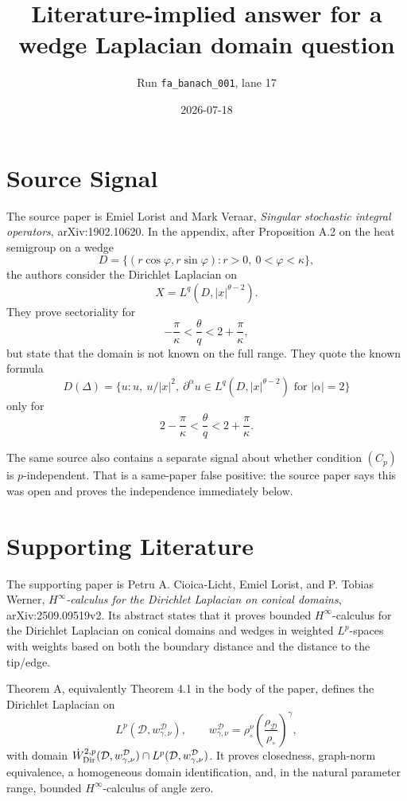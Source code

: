 \documentclass[11pt]{article}
\title{Literature-implied answer for a wedge Laplacian domain question}
\author{Run \texttt{fa\_banach\_001}, lane 17}
\date{2026-07-18}
\newcommand{\D}{D}
\begin{document}
\maketitle

\section*{Source Signal}

The source paper is Emiel Lorist and Mark Veraar,
\emph{Singular stochastic integral operators}, arXiv:1902.10620.
In the appendix, after Proposition A.2 on the heat semigroup on a wedge
\[
\D=\{(r\cos\varphi,r\sin\varphi): r>0,\ 0<\varphi<\kappa\},
\]
the authors consider the Dirichlet Laplacian on
\[
X=L^q(\D, |x|^{\theta-2}).
\]
They prove sectoriality for
\[
  -\frac{\pi}{\kappa}<\frac{\theta}{q}<2+\frac{\pi}{\kappa},
\]
but state that the domain is not known on the full range.  They quote the
known formula
\[
D(\Delta)=\{u: u,\ u/|x|^2,\ \partial^\alpha u\in L^q(\D,|x|^{\theta-2})
\text{ for }|\alpha|=2\}
\]
only for
\[
  2-\frac{\pi}{\kappa}<\frac{\theta}{q}<2+\frac{\pi}{\kappa}.
\]

The same source also contains a separate signal about whether condition
$(C_p)$ is \(p\)-independent.  That is a same-paper false positive: the source
paper says this was open and proves the independence immediately below.

\section*{Supporting Literature}

The supporting paper is Petru A. Cioica-Licht, Emiel Lorist, and P. Tobias
Werner, \emph{\(H^\infty\)-calculus for the Dirichlet Laplacian on conical
domains}, arXiv:2509.09519v2.  Its abstract states that it proves bounded
\(H^\infty\)-calculus for the Dirichlet Laplacian on conical domains and
wedges in weighted \(L^p\)-spaces with weights based on both the boundary
distance and the distance to the tip/edge.

Theorem A, equivalently Theorem 4.1 in the body of the paper, defines the
Dirichlet Laplacian on
\[
  L^p(\mathcal D,w_{\gamma,\nu}^{\mathcal D}),\qquad
  w_{\gamma,\nu}^{\mathcal D}=\rho_\circ^\nu
  \left(\frac{\rho_{\mathcal D}}{\rho_\circ}\right)^\gamma,
\]
with domain \(\dot W^{2,p}_{\rm Dir}(\mathcal D,w_{\gamma,\nu}^{\mathcal D})
\cap L^p(\mathcal D,w_{\gamma,\nu}^{\mathcal D})\).  It proves closedness,
graph-norm equivalence, a homogeneous domain identification, and, in the
natural parameter range, bounded \(H^\infty\)-calculus of angle zero.
\end{document}
